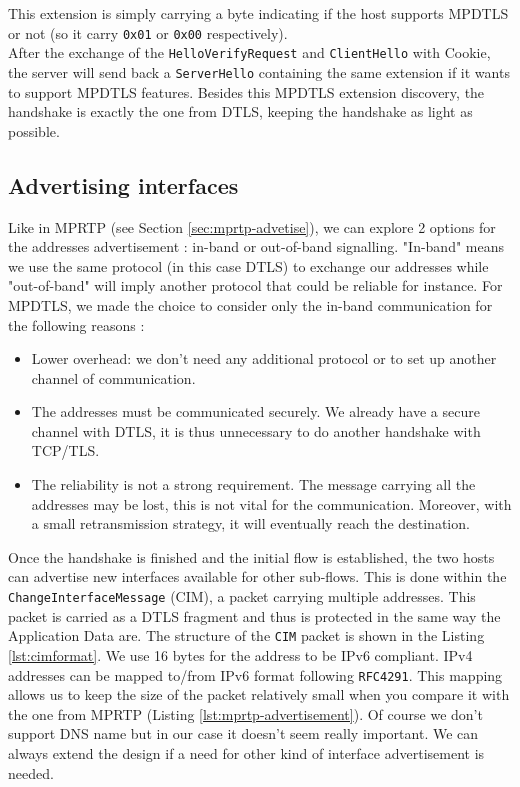 This extension is simply carrying a byte indicating if the host supports MPDTLS or not (so it carry \texttt{0x01} or \texttt{0x00} respectively).\\

After the exchange of the \texttt{HelloVerifyRequest} and \texttt{ClientHello} with Cookie, the server will send back a \texttt{ServerHello} containing the same extension if it wants to support MPDTLS features. Besides this MPDTLS extension discovery, the handshake is exactly the one from DTLS, keeping the handshake as light as possible.

\subsection{Advertising interfaces}
\label{sec:advertise}

Like in MPRTP (see Section \ref{sec:mprtp-advetise}), we can explore 2 options for the addresses advertisement : in-band or out-of-band signalling. "In-band" means we use the same protocol (in this case DTLS) to exchange our addresses while "out-of-band" will imply another protocol that could be reliable for instance. For MPDTLS, we made the choice to consider only the in-band communication for the following reasons : 

\begin{itemize}
\item Lower overhead: we don't need any additional protocol or to set up another channel of communication.
\item The addresses must be communicated securely. We already have a secure channel with DTLS, it is thus unnecessary to do another handshake with TCP/TLS.
\item The reliability is not a strong requirement. The message carrying all the addresses may be lost, this is not vital for the communication. Moreover, with a small retransmission strategy, it will eventually reach the destination.
\end{itemize}


Once the handshake is finished and the initial flow is established, the two hosts can advertise new interfaces available for other sub-flows. This is done within the \texttt{ChangeInterfaceMessage} (CIM), a packet carrying multiple addresses. This packet is carried as a DTLS fragment and thus is protected in the same way the Application Data are. The structure of the \texttt{CIM} packet is shown in the Listing \ref{lst:cimformat}. We use 16 bytes for the address to be IPv6 compliant. IPv4 addresses can be mapped to/from IPv6 format following \texttt{RFC4291}\cite{rfc4291}. This mapping allows us to keep the size of the packet relatively small when you compare it with the one from MPRTP (Listing \ref{lst:mprtp-advertisement}). Of course we don't support DNS name but in our case it doesn't seem really important. We can always extend the design if a need for other kind of interface advertisement is needed.


